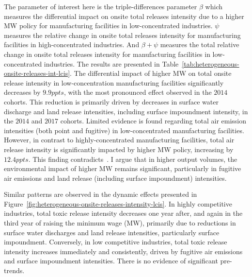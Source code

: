 \documentclass[12pt, english]{article}
\begin{document}
    The parameter of interest here is the triple-differences parameter $\beta$ which measures the differential impact on onsite total releases intensity due to a higher MW policy for manufacturing facilities in low-concentrated industries. $\psi$ measures the relative change in onsite total releases intensity for manufacturing facilities in high-concentrated industries. And $\beta + \psi$ measures the total relative change in onsite total releases intensity for manufacturing facilities in low-concentrated industries. The results are presented in Table~\ref{tab:heterogeneous-onsite-releases-int-lcis}. The differential impact of higher MW on total onsite release intensity in low-concentration manufacturing facilities significantly decreases by $9.9ppts$, with the most pronounced effect observed in the $2014$ cohorts. This reduction is primarily driven by decreases in surface water discharge and land release intensities, including surface impoundment intensity, in the $2014$ and $2017$ cohorts. Limited evidence is found regarding total air emission intensities (both point and fugitive) in low-concentrated manufacturing facilities. However, in contrast to highly-concentrated manufacturing facilities, total air release intensity is significantly impacted by higher MW policy, increasing by $12.4ppts$. This finding contradicts~\cite{zhang2023unintended}. I argue that in higher output volumes, the environmental impact of higher MW remains significant, particularly in fugitive air emissions and land release (including surface impoundment) intensities.
    

    Similar patterns are observed in the dynamic effects presented in Figure~\ref{fig:heterogeneous-onsite-releases-intensity-lcis}. In highly competitive industries, total toxic release intensity decreases one year after, and again in the third year of raising the minimum wage (MW), primarily due to reductions in surface water discharges and land release intensities, particularly surface impoundment. Conversely, in low competitive industries, total toxic release intensity increases immediately and consistently, driven by fugitive air emissions and surface impoundment intensities. There is no evidence of significant pre-trends.
\end{document}
